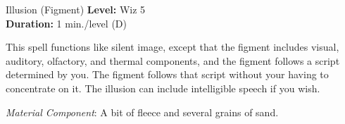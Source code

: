 {Illusion (Figment)}
{
	\textbf{Level:}
	Wiz 5\\
	\textbf{Duration:}
	1 min./level (D)\\
}
{
	This spell functions like silent image, except that the figment includes visual, auditory, olfactory, and thermal components, and the figment follows a script determined by you. The figment follows that script without your having to concentrate on it. The illusion can include intelligible speech if you wish.

	\textit{Material Component}:
	A bit of fleece and several grains of sand.

}
